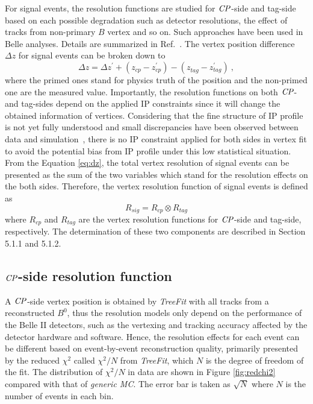 For signal events, the resolution functions are studied for $\it{CP}$-side and tag-side based on each possible degradation such as detector resolutions, the effect of tracks from non-primary $B$ vertex and so on. Such approaches have been used in Belle analyses. Details are summarized in Ref.~\cite{Yusa-note}. The vertex position difference $\Delta z$ for signal events can be broken down to 
\begin{equation}\label{eq:dz}
\Delta z 
=\Delta z^{'} + (z_{cp}^{}- z_{cp}^{'}) - (z_{tag}^{}- z_{tag}^{'}) ~,
\end{equation}
where the primed ones stand for physics truth of the position and the non-primed one are the measured value. Importantly, the resolution functions on both $\it{CP}$- and tag-sides depend on the applied IP constraints since it will change the obtained information of vertices. Considering that the fine structure of IP profile is not yet fully understood and small discrepancies have been observed between data and simulation~\cite{jpsiks_ichep}, there is no IP constraint applied for both sides in vertex fit to avoid the potential bias from  IP profile under this low statistical situation. From the Equation \ref{eq:dz}, the total vertex resolution of signal events can be presented as the sum of the two variables which stand for the resolution effects on the both sides. Therefore, the vertex resolution function of signal events is defined as
\begin{equation}\label{eq:Rsig}
R_{sig}=R_{cp}\otimes R_{tag}
\end{equation}
where $R_{cp}$ and $R_{tag}$ are the vertex resolution functions for $\it{CP}$-side and tag-side, respectively. 
The determination of these two components are described in Section 5.1.1 and 5.1.2.
\subsection{$\it{CP}$-side resolution function}
A $\it{CP}$-side vertex position is obtained by \textit{TreeFit} with all tracks from a reconstructed $B^0$, thus the resolution models only depend on the performance of the Belle II detectors, such as the vertexing and tracking accuracy affected by the detector hardware and software. Hence, the resolution effects for each event can be different based on event-by-event reconstruction quality, primarily presented by the reduced $\chi^2$ called $\chi^2/N$ from \textit{TreeFit}, which $N$ is the degree of freedom of the fit. The distribution of $\chi^2/N$ in data are shown in Figure \ref{fig:redchi2} compared with that of \textit{generic MC}. The error bar is taken as $\sqrt{N}$ where $N$ is the number of events in each bin.

